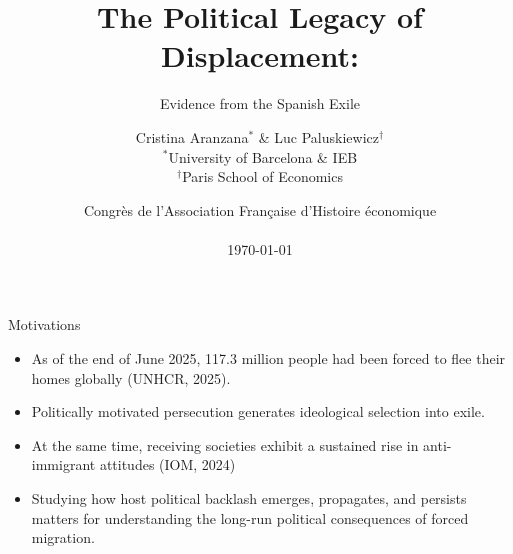 \documentclass[xcolor=dvipsnames, aspectratio=169]{beamer}
\title[The Political Legacy of Displacement]{The Political Legacy of Displacement:}
\subtitle{\large Evidence from the Spanish Exile}
\author[Aranzana, C. \& Paluskiewicz, L.]{Cristina Aranzana$^{*}$ \& Luc Paluskiewicz$^{\dagger}$\\
\vspace{0.25cm}
\scriptsize $^{*}$University of Barcelona \& IEB \\
\scriptsize $^{\dagger}$Paris School of Economics
}
\date{Congrès de l’Association Française 
d’Histoire économique \\ \vspace{0.1in}\\  \today}
\begin{document}
\begingroup
  \begin{frame}
    \titlepage
  \end{frame}
\endgroup

\setcounter{framenumber}{0} 


\begin{frame}{Motivations}

\begin{itemize}

  \item As of the end of June 2025, 117.3 million people had been forced to flee their homes globally (UNHCR, 2025). 
\vspace{0.4cm}
  \item Politically motivated persecution generates ideological selection into exile.
\vspace{0.4cm}
  \item At the same time, receiving societies exhibit a sustained rise in anti-immigrant attitudes (IOM, 2024)
\vspace{0.4cm}
  \item Studying how host political backlash emerges, propagates, and persists matters for understanding the long-run political consequences of forced migration.
\end{itemize}







\end{frame}
\end{document}

